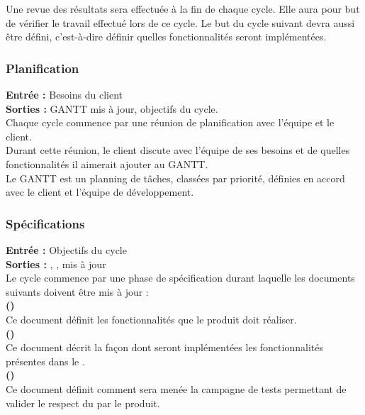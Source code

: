 Une revue des résultats sera effectuée à la fin de chaque cycle. Elle aura pour but de vérifier le travail effectué lors de ce cycle. Le but du cycle suivant devra aussi être défini, c’est-à-dire définir quelles fonctionnalités seront implémentées.



\subsubsection{Planification}


\textbf{Entrée :} Besoins du client \\
\textbf{Sorties :} GANTT mis à jour, objectifs du cycle.\\
Chaque cycle commence par une réunion de planification avec l’équipe et le client. \\
Durant cette réunion, le client discute avec l’équipe de ses besoins et de quelles fonctionnalités il aimerait ajouter au GANTT. \\
Le GANTT est un planning de tâches, classées par priorité, définies en accord avec le client et l'équipe de développement.

\subsubsection{Spécifications}
\label{specification}

\textbf{Entrée :} Objectifs du cycle \\
\textbf{Sorties :} \DSECourt , \DSICourt , \PTVCourt{} mis à jour \\
Le cycle commence par une phase de spécification durant laquelle les documents suivants doivent être mis à jour : \\



\textbf{\DSE (\DSECourt)} \\
Ce document définit les fonctionnalités que le produit doit réaliser.\\

\textbf{\DSI (\DSICourt)} \\
Ce document décrit la façon dont seront implémentées les fonctionnalités présentes dans le \DSECourt.\\

\textbf{\PTV (\PTVCourt)} \\
Ce document définit comment sera menée la campagne de tests permettant de valider le respect du \DSECourt{} par le produit. \\

